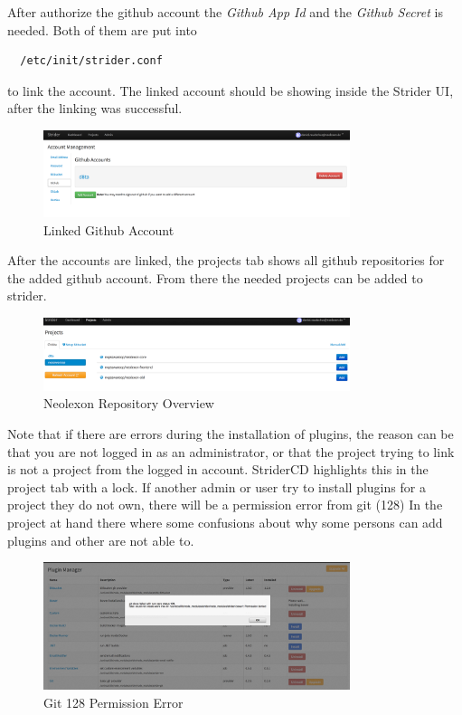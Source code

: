 After authorize the github account the \textit{Github App Id} and the \textit{Github Secret} is needed. Both of them are put
into

\begin{lstlisting}
  /etc/init/strider.conf
\end{lstlisting}

to link the account. The linked account should be showing inside the Strider UI, after the linking was successful.

\begin{figure}[h!]
  \centering
  \includegraphics[width=0.8\textwidth]{images/linkedGithub.png}
  \caption{Linked Github Account}
\end{figure}

After the accounts are linked, the projects tab shows all github repositories for the added github account. From there the needed projects can
be added to strider.

\begin{figure}[h!]
  \centering
  \includegraphics[width=0.8\textwidth]{images/neolexonGit.png}
  \caption{Neolexon Repository Overview}
\end{figure}

Note that if there are errors during the installation of plugins, the reason can be that you are not logged in as an administrator,
or that the project trying to link is not a project from the logged in account. StriderCD highlights this in the project tab with a lock.
If another admin or user try to install plugins for a project they do not own, there will be a permission error from git (128)
In the project at hand there where some confusions about why some persons can add plugins and other are not able to.

\begin{figure}[h!]
  \centering
  \includegraphics[width=0.8\textwidth]{images/permissionError.png}
  \caption{Git 128 Permission Error}
\end{figure}

